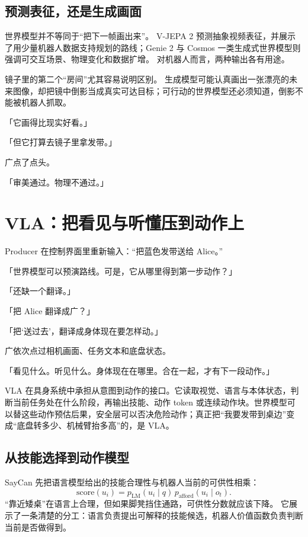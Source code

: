 \subsection{预测表征，还是生成画面}

世界模型并不等同于“把下一帧画出来”。
V-JEPA 2 预测抽象视频表征，并展示了用少量机器人数据支持规划的路线\cite{vjepa22025ch5}；Genie 2 与 Cosmos 一类生成式世界模型则强调可交互场景、物理变化和数据扩增\cite{genie22024ch5,cosmos2025ch5}。
对机器人而言，两种输出各有用途。


镜子里的第二个“房间”尤其容易说明区别。
生成模型可能认真画出一张漂亮的未来图像，却把镜中倒影当成真实可达目标；可行动的世界模型还必须知道，倒影不能被机器人抓取。

「它画得比现实好看。」

「但它打算去镜子里拿发带。」

广点了点头。

「审美通过。物理不通过。」

\section{VLA：把看见与听懂压到动作上}

Producer 在控制界面里重新输入：“把蓝色发带送给 Alice。”

「世界模型可以预演路线。可是，它从哪里得到第一步动作？」

「还缺一个翻译。」

「把 Alice 翻译成广？」

「把‘送过去’，翻译成身体现在要怎样动。」

广依次点过相机画面、任务文本和底盘状态。

「看见什么。听见什么。身体现在在哪里。合在一起，才有下一段动作。」

VLA 在具身系统中承担从意图到动作的接口。它读取视觉、语言与本体状态，判断当前任务处在什么阶段，再输出技能、动作 token 或连续动作块。世界模型可以替这些动作预估后果，安全层可以否决危险动作；真正把“我要发带到桌边”变成“底盘转多少、机械臂抬多高”的，是 VLA。

\subsection{从技能选择到动作模型}

SayCan 先把语言模型给出的技能合理性与机器人当前的可供性相乘\cite{ahn2022saycan}：
\begin{equation}
\mathrm{score}(u_i)
=
p_{\mathrm{LM}}(u_i\mid q)\,
p_{\mathrm{afford}}(u_i\mid o_t).
\end{equation}
“靠近矮桌”在语言上合理，但如果脚凳挡住通路，可供性分数就应该下降。
它展示了一条清楚的分工：语言负责提出可解释的技能候选，机器人价值函数负责判断当前是否做得到。

